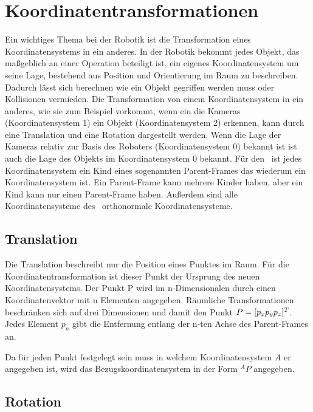 \section{Koordinatentransformationen}

Ein wichtiges Thema bei der Robotik ist die Transformation eines 
Koordinatensystems in ein anderes. In der Robotik bekommt jedes
Objekt, das maßgeblich an einer Operation beteiligt ist, ein eigenes
Koordinatensystem um seine Lage, bestehend aus Position und Orientierung
im Raum zu beschreiben. Dadurch lässt sich berechnen wie ein Objekt gegriffen
werden muss oder Kollisionen vermieden. Die Transformation von einem 
Koordinatensystem in ein anderes, wie sie zum Beispiel vorkommt, wenn ein die 
Kameras (Koordinatensystem 1) ein Objekt (Koordinatensystem 2) erkennen, kann
durch eine Translation und eine Rotation dargestellt werden. Wenn die Lage der
Kameras relativ zur Basis des Roboters (Koordinatensystem 0) bekannt ist ist
auch die Lage des Objekts im Koordinatensystem 0 bekannt. Für den \cob\ ist 
jedes Koordinatensystem ein Kind eines sogenannten Parent-Frames das wiederum 
ein Koordinatensystem ist. Ein Parent-Frame kann mehrere Kinder haben, aber ein
Kind kann nur einen Parent-Frame haben. Außerdem sind alle Koordinatensysteme
des \cob\ orthonormale Koordinatensysteme. 

\subsection{Translation}
\label{sub:Translation}


Die Translation beschreibt nur die Position eines Punktes im Raum. Für die 
Koordinatentransformation ist dieser Punkt der Ursprung des neuen Koordinatensystems.
Der Punkt P wird im n-Dimensionalen durch einen Koordinatenvektor mit n 
Elementen angegeben. Räumliche Transformationen beschränken sich auf drei Dimensionen
und damit den Punkt $P= [p_x\\p_y\\p_z]^T$. Jedes Element $p_n$ gibt die Entfernung
entlang der n-ten Achse des Parent-Frames an.

Da für jeden Punkt festgelegt sein muss in welchem Koordinatensystem $A$ er angegeben
ist, wird das Bezugskoordinatensystem in der Form $^AP$ angegeben.

\subsection{Rotation}
\label{sub:Rotation}

